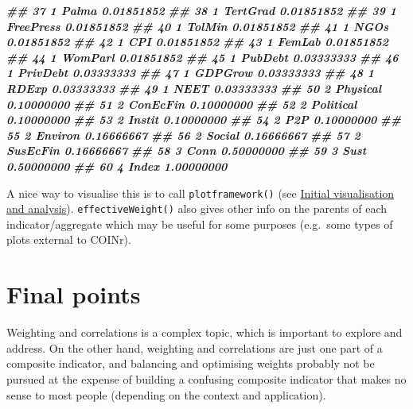 \documentclass[
]{book}
\newenvironment{Shaded}{\begin{snugshade}}{\end{snugshade}}
\newcommand{\DocumentationTok}[1]{\textcolor[rgb]{0.56,0.35,0.01}{\textbf{\textit{#1}}}}
\begin{document}
\begin{Shaded}
\begin{Highlighting}[]
\DocumentationTok{\#\# 37       1     Palma      0.01851852}
\DocumentationTok{\#\# 38       1  TertGrad      0.01851852}
\DocumentationTok{\#\# 39       1 FreePress      0.01851852}
\DocumentationTok{\#\# 40       1    TolMin      0.01851852}
\DocumentationTok{\#\# 41       1      NGOs      0.01851852}
\DocumentationTok{\#\# 42       1       CPI      0.01851852}
\DocumentationTok{\#\# 43       1    FemLab      0.01851852}
\DocumentationTok{\#\# 44       1   WomParl      0.01851852}
\DocumentationTok{\#\# 45       1   PubDebt      0.03333333}
\DocumentationTok{\#\# 46       1  PrivDebt      0.03333333}
\DocumentationTok{\#\# 47       1   GDPGrow      0.03333333}
\DocumentationTok{\#\# 48       1     RDExp      0.03333333}
\DocumentationTok{\#\# 49       1      NEET      0.03333333}
\DocumentationTok{\#\# 50       2  Physical      0.10000000}
\DocumentationTok{\#\# 51       2  ConEcFin      0.10000000}
\DocumentationTok{\#\# 52       2 Political      0.10000000}
\DocumentationTok{\#\# 53       2    Instit      0.10000000}
\DocumentationTok{\#\# 54       2       P2P      0.10000000}
\DocumentationTok{\#\# 55       2   Environ      0.16666667}
\DocumentationTok{\#\# 56       2    Social      0.16666667}
\DocumentationTok{\#\# 57       2  SusEcFin      0.16666667}
\DocumentationTok{\#\# 58       3      Conn      0.50000000}
\DocumentationTok{\#\# 59       3      Sust      0.50000000}
\DocumentationTok{\#\# 60       4     Index      1.00000000}
\end{Highlighting}
\end{Shaded}

A nice way to visualise this is to call \texttt{plotframework()} (see \protect\hyperlink{initial-visualisation-and-analysis}{Initial visualisation and analysis}). \texttt{effectiveWeight()} also gives other info on the parents of each indicator/aggregate which may be useful for some purposes (e.g.~some types of plots external to COINr).

\hypertarget{final-points}{%
\section{Final points}\label{final-points}}

Weighting and correlations is a complex topic, which is important to explore and address. On the other hand, weighting and correlations are just one part of a composite indicator, and balancing and optimising weights probably not be pursued at the expense of building a confusing composite indicator that makes no sense to most people (depending on the context and application).
\end{document}
